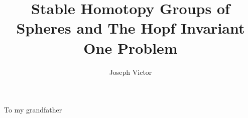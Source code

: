 \documentclass[a4paper,12pt]{article}
\newenvironment{dedication}
{
   \cleardoublepage
   \thispagestyle{empty}
   \vspace*{\stretch{1}}
   \hfill\begin{minipage}[t]{0.66\textwidth}
   \raggedright
}%
{
   \end{minipage}
   \vspace*{\stretch{3}}
   \clearpage
}
\begin{document}
\newcommand{\A}[0]{\mathcal{A}}
\newcommand{\Z}[0]{\mathbb{Z}}
\newcommand{\R}[0]{\mathbb{R}}
\newcommand{\C}[0]{\mathbb{C}}
\newcommand{\OO}[0]{\mathcal{O}}
\newcommand{\F}[0]{\mathbb{F}}
\newcommand{\binomial}[2]{\left(\begin{array}{c}#1\\#2\end{array}\right)}
\newcommand{\from}[0]{\longleftarrow}

\newtheorem{Def}{Definition}[subsection]
\newtheorem{Theorem}[Def]{Theorem}
\newtheorem{Lemma}[Def]{Lemma}
\newtheorem{Cor}[Def]{Corrolary}
\newtheorem{RefDiagram}[Def]{Diagram}
\newtheorem{Remark}[Def]{Remark}

\newcommand{\Hom}{\operatorname{Hom}\nolimits}
\newcommand{\Ext}{\operatorname{Ext}\nolimits}
\newcommand{\Torsion}{\operatorname{Torsion}\nolimits}
\newcommand{\Cyl}{\operatorname{Cyl}\nolimits}
\newcommand{\Ker}{\operatorname{Ker}\nolimits}
\newcommand{\im}{\operatorname{Im}\nolimits}



\title{Stable Homotopy Groups of Spheres and The Hopf Invariant One Problem}
\author{Joseph Victor}
\maketitle

\begin{dedication}
  To my grandfather
\end{dedication}


\newpage
\tableofcontents
\newpage
 


\newpage

\newpage

\newpage

\newpage

\newpage



\newpage
\appendix
\appendixpage
\addappheadtotoc

\newpage

\newpage


\newpage


\end{document}
